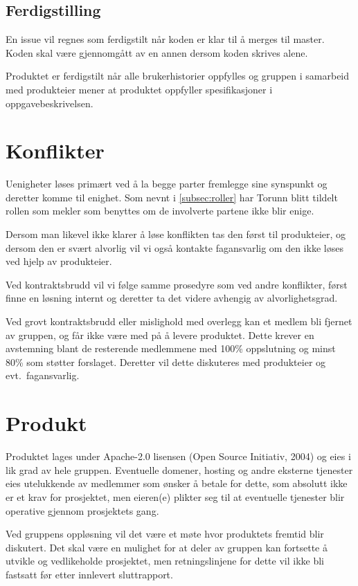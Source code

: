 \documentclass[11pt]{article}
\begin{document}
	\subsection{Ferdigstilling}
	En issue vil regnes som ferdigstilt når koden er klar til å merges til master. Koden skal være gjennomgått av en annen dersom koden skrives alene.
	
	Produktet er ferdigstilt når alle brukerhistorier oppfylles og gruppen i samarbeid med produkteier mener at produktet oppfyller spesifikasjoner i oppgavebeskrivelsen.
	
	\section{Konflikter}
	
	Uenigheter løses primært ved å la begge parter fremlegge sine synspunkt og deretter komme til enighet. Som nevnt i \ref{subsec:roller}
	har Torunn blitt tildelt rollen som mekler som benyttes om de involverte partene ikke blir enige. 
	
	Dersom man likevel ikke klarer å løse konflikten tas den først til produkteier, og dersom den er svært alvorlig vil vi også kontakte fagansvarlig om den ikke løses ved hjelp av produkteier. 
	
	Ved kontraktsbrudd vil vi følge samme prosedyre som ved andre konflikter, først finne en løsning internt og deretter ta det videre avhengig av alvorlighetsgrad.
	
	Ved grovt kontraktsbrudd eller mislighold med overlegg kan et medlem bli fjernet av gruppen, og får ikke være med på å levere produktet. Dette krever en avstemning blant de resterende medlemmene med 100\% oppslutning og minst 80\% som støtter forslaget. Deretter vil dette diskuteres med produkteier og evt.~fagansvarlig.
	
	\section{Produkt}
	Produktet lages under Apache-2.0 lisensen (Open Source Initiativ, 2004) og eies i lik grad av hele gruppen. Eventuelle domener, hosting og andre eksterne tjenester eies utelukkende av medlemmer som ønsker å betale for dette, som absolutt ikke er et krav for prosjektet, men eieren(e) plikter seg til at eventuelle tjenester blir operative gjennom prosjektets gang. 
	
	Ved gruppens oppløsning vil det være et møte hvor produktets fremtid blir diskutert. Det skal være en mulighet for at deler av gruppen kan fortsette å utvikle og vedlikeholde prosjektet, men retningslinjene for dette vil ikke bli fastsatt før etter innlevert sluttrapport.
	
\end{document}
